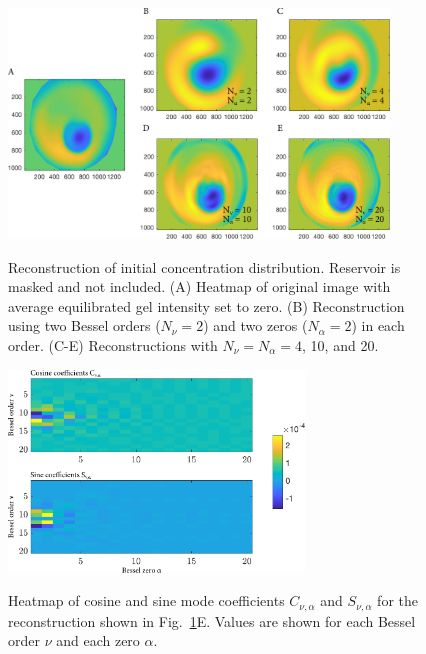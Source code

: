 \begin{figure}
\caption[Reconstruction of initial concentration distribution.]{Reconstruction of initial concentration distribution. Reservoir is masked and not included.  (A) Heatmap of original image with average equilibrated gel intensity set to zero. (B) Reconstruction using two Bessel orders ($N_\nu = 2$) and two zeros ($N_\alpha = 2$) in each order. (C-E) Reconstructions with $N_\nu = N_\alpha = 4$, 10, and 20.}
\centering
\includegraphics[width=0.9\textwidth]{figs/ch04/reconstruction-16_2_4_10_20.pdf}
\label{fig:initDist}
\end{figure} 

\begin{figure}
\caption[Heatmap of mode coefficients.]{Heatmap of cosine and sine mode coefficients $C_{\nu,\alpha}$ and $S_{\nu,\alpha}$ for the reconstruction shown in Fig.~\ref{fig:initDist}E. Values are shown for each Bessel order $\nu$ and each zero $\alpha$. \\}
\centering
\includegraphics[width=0.7\textwidth]{figs/ch04/rec_16_cos_sin_array_20_terms.pdf}
\label{fig:arrays}
\end{figure} 

